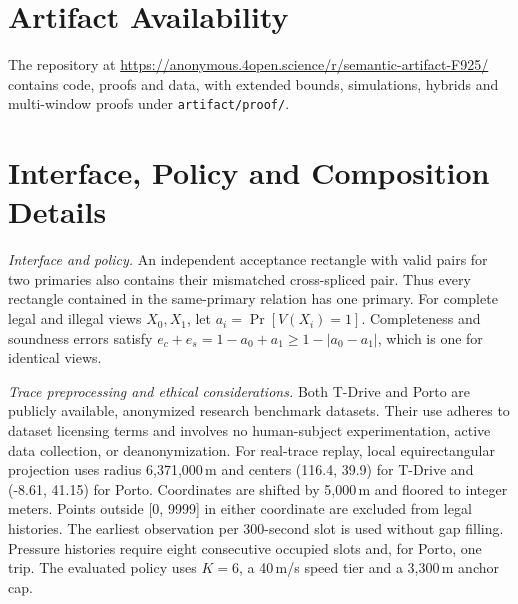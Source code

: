 \documentclass[conference,compsoc]{IEEEtran}
\theoremstyle{definition}
\numberwithin{equation}{section}
\numberwithin{table}{section}
\numberwithin{figure}{section}
\theoremstyle{plain}
\begin{document}
\section{Artifact Availability}
\label{sec:artifact}
The repository at \url{https://anonymous.4open.science/r/semantic-artifact-F925/} contains code, proofs and data,\label{sec:artifact-proofs} with extended bounds, simulations, hybrids and multi-window proofs under \nolinkurl{artifact/proof/}.

\FloatBarrier
\clearpage
\label{boundary:references}
{\footnotesize
\printbibliography}
\clearpage
\appendices
\renewcommand{\thetheorem}{\Alph{section}.\arabic{theorem}}
\renewcommand{\theHtheorem}{\Alph{section}.\arabic{theorem}}
\renewcommand{\thelemma}{\Alph{section}.\arabic{lemma}}
\renewcommand{\theHlemma}{\Alph{section}.\arabic{lemma}}
\renewcommand{\theproposition}{\Alph{section}.\arabic{proposition}}
\renewcommand{\theHproposition}{\Alph{section}.\arabic{proposition}}
\renewcommand{\thedefinition}{\Alph{section}.\arabic{definition}}
\renewcommand{\theHdefinition}{\Alph{section}.\arabic{definition}}
\setcounter{theorem}{0}
\setcounter{lemma}{0}
\setcounter{proposition}{0}
\setcounter{definition}{0}
\section{Interface, Policy and Composition Details}
\label{boundary:appendix}
\label{sec:composition-failures}

\par\noindent\emph{Interface and policy.}
\label{cor:submission-shared-tag}
An independent acceptance rectangle with valid pairs for two primaries also
contains their mismatched cross-spliced pair. Thus every rectangle contained in
the same-primary relation has one primary.
\label{sec:history-interface}
For complete legal and illegal views \(X_0,X_1\), let
\(a_i=\Pr[V(X_i)=1]\). Completeness and soundness errors satisfy
\(e_c+e_s=1-a_0+a_1\ge1-|a_0-a_1|\), which is one for identical views.

\par\noindent\emph{Trace preprocessing and ethical considerations.}
\label{app:policy}
Both T-Drive and Porto are publicly available, anonymized research benchmark datasets.
Their use adheres to dataset licensing terms and involves no human-subject experimentation, active data collection, or deanonymization.
For real-trace replay, local equirectangular projection uses radius
6,371,000\,m and centers (116.4, 39.9) for T-Drive and (-8.61, 41.15) for Porto. Coordinates are shifted by 5,000\,m and floored to integer meters.
Points outside [0, 9999] in either coordinate are excluded from legal histories.
The earliest observation per 300-second slot is used without gap filling.
Pressure histories require eight consecutive occupied slots and, for Porto,
one trip. The evaluated policy uses \(K=6\), a 40\,m/s speed tier and a 3,300\,m anchor cap.
\end{document}
